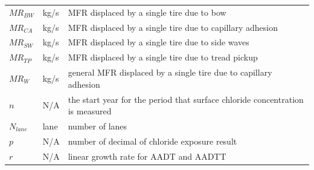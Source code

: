 \documentclass[12pt]{article}
\begin{document}
\begin{longtable*}{l l p{12cm}}
$\mathit{MR_{BW}}$ & \si{kg/s} & MFR displaced by a single tire due to bow\\
$\mathit{MR_{CA}}$ & \si{kg/s} & MFR displaced by a single tire due to capillary adhesion\\
$\mathit{MR_{SW}}$ & \si{kg/s} & MFR displaced by a single tire due to side waves\\
$\mathit{MR_{TP}}$ & \si{kg/s} & MFR displaced by a single tire due to tread pickup\\
$\mathit{MR_{W}}$ & \si{kg/s} & general MFR displaced by a single tire due to capillary adhesion\\
$n$ & N/A & the start year for the period that surface chloride concentration is measured\\
$N_{lane}$ & lane & number of lanes\\
$p$ & N/A & number of decimal of chloride exposure result \\
$r$ & N/A & linear growth rate for AADT and AADTT \\


\end{longtable*}
\end{document}
